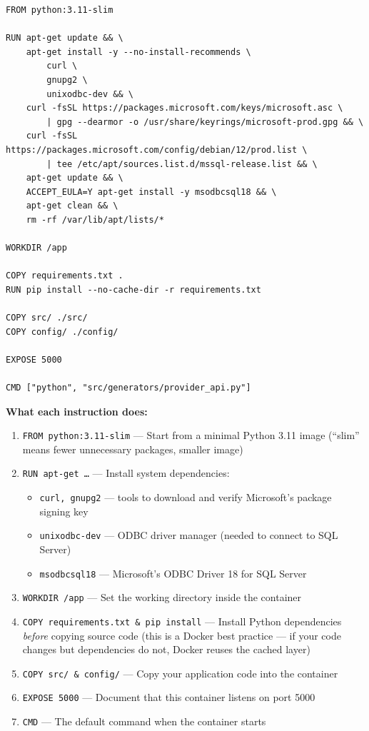 \documentclass[12pt, a4paper, oneside]{report}
\begin{document}
\begin{lstlisting}[style=dockerstyle, caption={docker/Dockerfile.generator}]
FROM python:3.11-slim

RUN apt-get update && \
    apt-get install -y --no-install-recommends \
        curl \
        gnupg2 \
        unixodbc-dev && \
    curl -fsSL https://packages.microsoft.com/keys/microsoft.asc \
        | gpg --dearmor -o /usr/share/keyrings/microsoft-prod.gpg && \
    curl -fsSL https://packages.microsoft.com/config/debian/12/prod.list \
        | tee /etc/apt/sources.list.d/mssql-release.list && \
    apt-get update && \
    ACCEPT_EULA=Y apt-get install -y msodbcsql18 && \
    apt-get clean && \
    rm -rf /var/lib/apt/lists/*

WORKDIR /app

COPY requirements.txt .
RUN pip install --no-cache-dir -r requirements.txt

COPY src/ ./src/
COPY config/ ./config/

EXPOSE 5000

CMD ["python", "src/generators/provider_api.py"]
\end{lstlisting}

\textbf{What each instruction does:}

\begin{enumerate}[label=\textcolor{primary}{\textbf{\arabic*.}}]
    \item \texttt{FROM python:3.11-slim} --- Start from a minimal Python 3.11 image (``slim'' means fewer unnecessary packages, smaller image)
    \item \texttt{RUN apt-get \ldots} --- Install system dependencies:
    \begin{itemize}
        \item \texttt{curl, gnupg2} --- tools to download and verify Microsoft's package signing key
        \item \texttt{unixodbc-dev} --- ODBC driver manager (needed to connect to SQL Server)
        \item \texttt{msodbcsql18} --- Microsoft's ODBC Driver 18 for SQL Server
    \end{itemize}
    \item \texttt{WORKDIR /app} --- Set the working directory inside the container
    \item \texttt{COPY requirements.txt \& pip install} --- Install Python dependencies \textit{before} copying source code (this is a Docker best practice --- if your code changes but dependencies do not, Docker reuses the cached layer)
    \item \texttt{COPY src/ \& config/} --- Copy your application code into the container
    \item \texttt{EXPOSE 5000} --- Document that this container listens on port 5000
    \item \texttt{CMD} --- The default command when the container starts
\end{enumerate}
\end{document}
